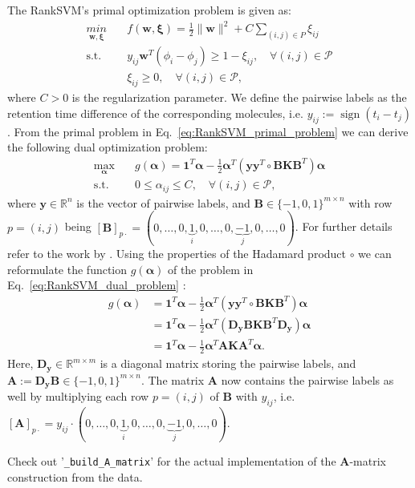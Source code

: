 \documentclass{article}
\newcommand{\st}{\text{s.t.}}
\newcommand{\defi}{:=}
\newcommand{\balpha}{\boldsymbol{\alpha}}
\newcommand{\bones}{\mathbf{1}}
\newcommand{\numexp}{n}
\newcommand{\numpair}{m}
\DeclareMathOperator{\sign}{sign}
\begin{document}
The RankSVM's primal optimization problem is given as: 
\begin{equation}
\begin{split}
    \underset{\mathbf{w},\boldsymbol{\xi}}{min} 
        &\quad f(\mathbf{w},\boldsymbol{\xi}) = \frac{1}{2}\|\mathbf{w}\|^2 + C\sum_{(i,j)\in P}\xi_{ij} \\
    \st &\quad y_{ij}\mathbf{w}^T(\phi_i-\phi_j)\geq 1-\xi_{ij},\quad\forall(i,j)\in\mathcal{P}\\
        &\quad \xi_{ij} \geq 0,\quad\forall(i,j)\in\mathcal{P},
    \label{eq:RankSVM_primal_problem}
\end{split}
\end{equation}
where $C>0$ is the regularization parameter. We define the pairwise labels as the retention time difference of the corresponding molecules, i.e. $y_{ij}\defi\sign(t_i-t_j)$. From the primal problem in Eq.~\eqref{eq:RankSVM_primal_problem} we can derive the following dual optimization problem:
\begin{equation}
\begin{split}
    \underset{\balpha}{\max} 
        &\quad g(\balpha) = \bones^T\balpha - \frac{1}{2} \balpha^T\left(\mathbf{y}\mathbf{y}^T\circ\mathbf{B}\mathbf{K}\mathbf{B}^T\right)\balpha \\ 
    \st &\quad 0\leq\alpha_{ij}\leq C,\quad\forall (i,j)\in \mathcal{P},
    \label{eq:RankSVM_dual_problem}
\end{split}
\end{equation}
where $\mathbf{y}\in\mathbb{R}^\numexp$ is the vector of pairwise labels, and $\mathbf{B}\in\{-1,0,1\}^{\numpair\times\numexp}$ with row $p=(i,j)$ being $[\mathbf{B}]_{p\cdot}=(0,\ldots,0,\underbrace{1}_{i},0,\ldots,0,\underbrace{-1}_{j},0,\ldots,0)$. For further details refer to the work by \cite{Kuo2014}. Using the properties of the Hadamard product $\circ$ we can reformulate the function $g(\balpha)$ of the problem in Eq.~\eqref{eq:RankSVM_dual_problem} \parencite{Styan1973}:
\begin{align}
    g(\balpha) 
        &= \bones^T\balpha-\frac{1}{2} \balpha^T\left(\mathbf{y}\mathbf{y}^T\circ\mathbf{B}\mathbf{K}\mathbf{B}^T\right)\balpha \\
        &= \bones^T\balpha-\frac{1}{2} \balpha^T\left(\mathbf{D}_\mathbf{y}\mathbf{B}\mathbf{K}\mathbf{B}^T\mathbf{D}_\mathbf{y}\right)\balpha \\
        &= \bones^T\balpha-\frac{1}{2} \balpha^T\mathbf{A}\mathbf{K}\mathbf{A}^T\balpha.
\end{align}
Here, $\mathbf{D}_\mathbf{y}\in\mathbb{R}^{\numpair\times\numpair}$ is a diagonal matrix storing the pairwise labels, and $\mathbf{A}\defi\mathbf{D}_\mathbf{y}\mathbf{B}\in\{-1,0,1\}^{\numpair\times\numexp}$. The matrix $\mathbf{A}$ now contains the pairwise labels as well by multiplying each row $p=(i,j)$ of $\mathbf{B}$ with $y_{ij}$, i.e. $[\mathbf{A}]_{p\cdot}=y_{ij}\cdot(0,\ldots,0,\underbrace{1}_{i},0,\ldots,0,\underbrace{-1}_{j},0,\ldots,0)$. 
\begin{mdframed}[style=codeframe]
    Check out '\texttt{\_build\_A\_matrix}' for the actual implementation of the $\mathbf{A}$-matrix construction from the data.
\end{mdframed}
\end{document}
